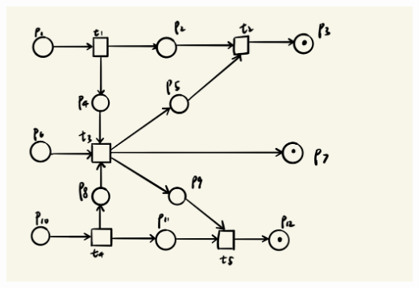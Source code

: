 \documentclass[runningheads]{llncs}
\begin{document}
\begin{enumerate}
    \includegraphics[scale=0.15]{token3.jpeg}
    
\end{enumerate}
\end{document}
